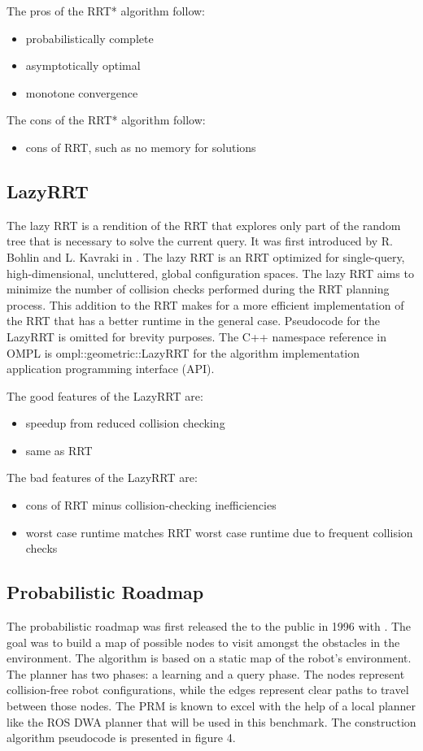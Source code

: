 \documentclass[conference]{IEEEtran} \usepackage[T1]{fontenc} \usepackage[backend=biber, style=ieee]{biblatex}
\begin{document}
The pros of the RRT* algorithm follow:
\begin{itemize}
\item probabilistically complete
\item asymptotically optimal
\item monotone convergence
\end{itemize}

The cons of the RRT* algorithm follow:
\begin{itemize}
\item cons of RRT, such as no memory for solutions
\end{itemize}


\subsection{LazyRRT} \label{LazyRRT}
The lazy RRT is a rendition of the RRT that explores only part of the random tree that is necessary to solve the current query. It was first introduced by R. Bohlin and 
L. Kavraki in \cite{lazy_rrt}. The lazy RRT is an RRT optimized for single-query, high-dimensional, uncluttered, global configuration spaces. The lazy RRT aims to 
minimize the number of collision checks performed during the RRT planning process. This addition to the RRT makes for a more efficient implementation of the RRT that has 
a better runtime in the general case. Pseudocode for the LazyRRT is omitted for brevity purposes. The C++ namespace reference in OMPL is ompl::geometric::LazyRRT for
the algorithm implementation application programming interface (API).

The good features of the LazyRRT are:
\begin{itemize}
\item speedup from reduced collision checking
\item same as RRT
\end{itemize}

The bad features of the LazyRRT are:
\begin{itemize}
\item cons of RRT minus collision-checking inefficiencies
\item worst case runtime matches RRT worst case runtime due to frequent collision checks
\end{itemize}

\subsection{Probabilistic Roadmap} \label{PRM}
The probabilistic roadmap was first released the to the public in 1996 with \cite{prm}. The goal was to build a map of possible nodes to visit amongst the obstacles in 
the environment. The algorithm is based on a static map of the robot's environment. The planner has two phases: a learning and a query phase. The nodes represent 
collision-free robot configurations, while the edges represent clear paths to travel between those nodes. The PRM is known to excel with the help of a local planner like 
the ROS DWA planner that will be used in this benchmark. The construction algorithm pseudocode is presented in figure 4.
\end{document}
